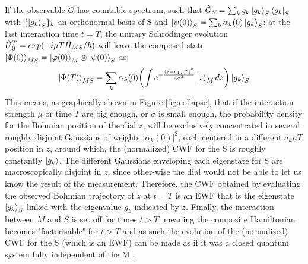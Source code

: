 \documentclass[11pt, a4paper]{article} %
\begin{document}
If the observable $G$ has countable spectrum, such that $\hat{G}_S=\sum_k g_k \ket{g_k}_S\bra{g_k}_S$ with $\{\ket{g_k}_S\}_k$ an orthonormal basis of S and $\ket{\psi(0)}_S=\sum_k \alpha_k(0)\ket{g_k}_S$: at the last interaction time $t=T$, the unitary Schrödinger evolution $\hat{U} \null_{0}^T=exp(-i\mu T \hat{H}_{MS}/\hbar)$ will leave the composed state $\ket{\Phi(0)}_{MS}=\ket{\varphi(0)}_M\otimes\ket{\psi(0)}_S$ as:
\begin{equation}\label{postM1}
\ket{\Phi(T)}_{MS}=\sum_k \alpha_k(0)\qty(\int e^{-\frac{(z-a_k\mu T)^2}{4\sigma^2}}\ket{z}_M dz )\ket{g_k}_S
\end{equation}
This means, as graphically shown in Figure \ref{fig:collapse}, that if the interaction strength $\mu$ or time $T$ are big enough, or $\sigma$ is small enough, the probability density for the Bohmian position of the dial $z$, will be exclusively concentrated in several roughly disjoint Gaussians of weights $|\alpha_k(0)|^2$, each centered in a different $a_k \mu T$ position in $z$, around which, the (normalized) CWF for the S is roughly constantly $\ket{g_k}$. The different Gaussians enveloping each eigenstate for S are macroscopically disjoint in $z$, since other-wise the dial would not be able to let us know the result of the measurement. Therefore, the CWF obtained by evaluating the observed Bohmian trajectory of $z$ at $t=T$ is an EWF that is the eigenstate $\ket{g_k}_S$ linked with the eigenvalue $g_k$ indicated by $z$. Finally, the interaction between $M$ and $S$ is set off for times $t>T$, meaning the composite Hamiltonian becomes "factorisable" for $t>T$ and as such the evolution of the (normalized) CWF for the S (which is an EWF) can be made as if it was a closed quantum system fully independent of the M \cite{JordiXavier}. 

\end{document}
